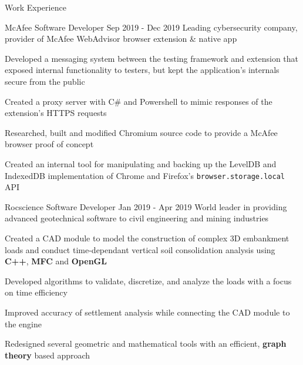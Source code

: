 \documentclass{resume} %
\begin{document}
\begin{rSection}{Work Experience}
    
    \begin{workexperience}
        {McAfee}
        {Software Developer}
        {Sep 2019 - Dec 2019}
        {Leading cybersecurity company, provider of McAfee WebAdvisor browser extension \& native app}
        {
            \item Developed a messaging system between the testing framework and extension that exposed internal functionality to testers, but kept the application's internals secure from the public
            \item Created a proxy server with C\# and Powershell to mimic responses of the extension's HTTPS requests  
            \item Researched, built and modified Chromium source code to provide a McAfee browser proof of concept 
            \item Created an internal tool for manipulating and backing up the LevelDB and IndexedDB implementation of Chrome and Firefox's \texttt{browser.storage.local} API
        }
    \end{workexperience}

    \begin{workexperience}
        {Rocscience}
        {Software Developer}
        {Jan 2019 - Apr 2019}
        {World leader in providing advanced geotechnical software to civil engineering and mining industries}
        {
            \item Created a CAD module to model the construction of complex 3D embankment loads and 
            conduct time-dependant vertical soil consolidation analysis using \textbf{C++}, \textbf{MFC} and \textbf{OpenGL}
            \item Developed algorithms to validate, discretize, and analyze the loads with a focus on time efficiency
            \item Improved accuracy of settlement analysis while connecting the CAD module to the engine
            \item Redesigned several geometric and mathematical tools with an efficient, \textbf{graph theory} based approach
        }
    \end{workexperience}

    \vspace{1em}
    

\end{rSection}
\end{document}
